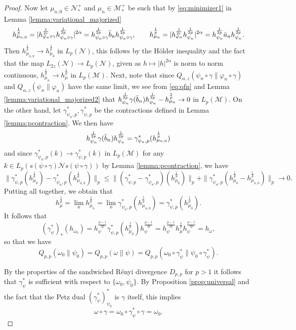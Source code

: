 \documentclass[12pt]{article}
\theoremstyle{definition}
\theoremstyle{remark}
\numberwithin{equation}{section}
\def\Me{\mathcal M}
\def\Ne{\mathcal N}
\def\ffi{\varphi}
\begin{document}
\begin{proof}
Now let $\mu_{n,0}\in \Ne_*^+$ and $\mu_n\in \Me_*^+$ be such that by  \eqref{eq:minimizer1}
in Lemma \ref{lemma:variational_majorized}
\begin{align*}
h_{\mu_{n,0}}^{\frac 1p}= |h_{\ffi_n\circ\gamma}^{1\over 2r}h_{\psi_n\circ\gamma}^{1\over 2p}|^{2\alpha}=
h_{\psi_n\circ\gamma}^{\frac 1{2p}}\bar b_{n}
h_{\psi_n\circ\gamma}^{\frac1{2p}},\qquad
h_{\mu_{n}}^{\frac1p}=|h_{\ffi_n}^{1\over 2r}h_{\psi_n}^{1\over 2p}|^{2\alpha}= h_{\psi_n}^{\frac 1{2p}}\bar a_{n}
h_{\psi_n}^{\frac1{2p}}. 
\end{align*}
Then $h_{\mu_{n,0}}^{\frac1p}\to h_{\mu_0}^{\frac1p}$ in $L_p(\Ne)$, this follows by the H\"older
inequality and the fact that the map $L_{2z}(\Ne)\to L_p(\Ne)$, given as $h\mapsto
|h|^{2\alpha}$ is norm to norm continuous, %
$h_{\mu_n}^{\frac1p}\to h_\mu^{\frac1p}$ in $L_p(\Me)$. 
Next, note that since
$Q_{\alpha,z}(\psi_n\circ\gamma\|\ffi_n\circ\gamma)$ and $Q_{\alpha,z}(\psi_n\|\ffi_n)$
have the same limit, we see from \eqref{eq:qfn} and Lemma
\ref{lemma:variational_majorized2} that 
$h_{\psi_n}^{\frac 1{2p}}\gamma(\bar b_{n})h_{\psi_n}^{1\over 2p}-h_{\mu_n}^{\frac1p}\to
0$ in $L_p(\Me)$.  On the other hand, let $\gamma^*_{\psi_n,p}, \gamma^*_{\psi,p}$ be the
contractions defined in Lemma \ref{lemma:pcontraction}. We
then have 
\[
h_{\psi_n}^{\frac 1{2p}}\gamma(\bar b_{n})h_{\psi_n}^{1\over
2p}=\gamma_{\psi_{n},p}^*(h_{\mu_{n,0}}^{\frac1p})
\]
and since $\gamma^*_{\psi_{n},p}(k)\to \gamma^*_{\psi,p}(k)$ in $L_p(\Me)$ for any
$k\in L_p(s(\psi\circ\gamma)\Ne s(\psi\circ\gamma))$ by Lemma \ref{lemma:pcontraction}, we have  
\[
\|\gamma^*_{\psi,p}(h_{\mu_0}^{\frac1p})-\gamma_{\psi_{n},p}^*(h_{\mu_{n,0}}^{\frac1p})\|_p\le
\|(\gamma^*_{\psi,p}-\gamma^*_{\psi_{n},p})(h_{\mu_0}^{\frac1p})\|_p+
\|\gamma^*_{\psi_{n},p}(h_{\mu_0}^{\frac1p}-h_{\mu_{n,0}}^{\frac1p})\|_p\to 0.
\]
Putting all together, we obtain that 
\[
h_\mu^{\frac1p}=\lim_n h_{\mu_n}^{\frac1p}=\lim_n
\gamma^*_{\psi_{n},p}(h_{\mu_{n,0}}^{\frac1p})=\gamma^*_{\psi,p}(h_{\mu_0}^{\frac1p}).
\]
It follows that 
\[
(\gamma^*_{\psi})_*(h_{\omega_0})=h_{\psi}^{\frac{p-1}{2p}}\gamma^*_{\psi,p}(h_{\mu_0}^{\frac1p})h_{\psi}^{\frac{p-1}{2p}}=h_{\psi}^{\frac{p-1}{2p}}h_\mu^{\frac1p}h_{\psi}^{\frac{p-1}{2p}}=h_\omega,
\]
so that we have
\[
Q_{p,p}(\omega_0\|\psi_0)=Q_{p,p}(\omega\|\psi)=Q_{p,p}(\omega_0\circ
\gamma^*_\psi\|\psi_0\circ\gamma^*_\psi).
\]


By the properties of the sandwiched R\'enyi divergence $D_{p,p}$ for $p>1$
\cite[Thm. ]{jencova2018renyi} it follows that
$\gamma^*_\psi$ is sufficient with respect to $\{\omega_0,\psi_0\}$. By Proposition \ref{prop:universal} and the fact that the
Petz dual  $(\gamma_\psi^*)_{\psi_0}^*$ is $\gamma$ itself, this implies 
\[
\omega\circ\gamma= \omega_0\circ \gamma_\psi^*\circ\gamma=\omega_0.
\]



\end{proof}
\end{document}
